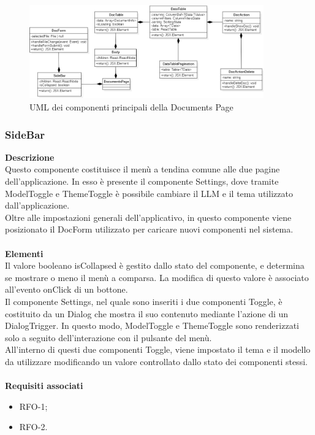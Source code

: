 \begin{figure}[h!]
    \centering  
    \includegraphics[width=0.9\textwidth]{DocumentPageView.png}
    \caption{UML dei componenti principali della Documents Page}
\end{figure}

\subsubsection{SideBar}

\textbf{Descrizione}\\
Questo componente costituisce il menù a tendina comune alle due pagine dell'applicazione. In esso è presente il componente Settings, dove tramite ModelToggle e ThemeToggle è possibile cambiare il LLM e il tema utilizzato dall'applicazione.\\
Oltre alle impostazioni generali dell'applicativo, in questo componente viene posizionato il DocForm utilizzato per caricare nuovi componenti nel sistema.\\ \\
\textbf{Elementi}\\
Il valore booleano isCollapsed è gestito dallo stato del componente, e determina se mostrare o meno il menù a comparsa. La modifica di questo valore è associato all'evento onClick di un bottone.\\
Il componente Settings, nel quale sono inseriti i due componenti Toggle, è costituito da un Dialog che mostra il suo contenuto mediante l'azione di un DialogTrigger. In questo modo, ModelToggle e ThemeToggle sono renderizzati solo a seguito dell'interazione con il pulsante del menù.\\
All'interno di questi due componenti Toggle, viene impostato il tema e il modello da utilizzare modificando un valore controllato dallo stato dei componenti stessi.\\ \\
\textbf{Requisiti associati}
\begin{itemize}
    \item RFO-1;
    \item RFO-2.
\end{itemize}

